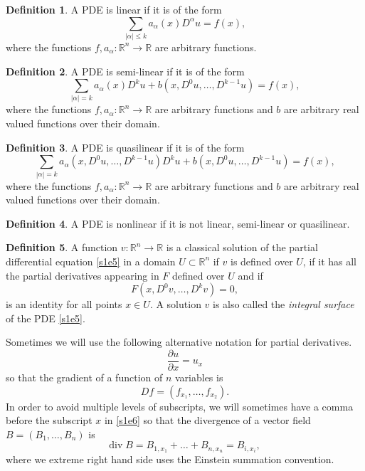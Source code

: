 \documentclass{article}
\newcommand{\pd}[2]{\frac{\partial{#1}}{\partial{#2}}}
\theoremstyle{plain}
\numberwithin{thm}{section}
\theoremstyle{plain}
\numberwithin{prop}{section}
\theoremstyle{definition}
\newtheorem{defn}{Definition}
\numberwithin{defn}{section}
\theoremstyle{remark}
\numberwithin{equation}{section}
\begin{document}
\begin{defn}\label{s1d2}
A PDE is linear if it is of the form
\[
\sum_{|\alpha| \le k}a_\alpha(x) D^\alpha u = f(x),
\]
where the functions $f, a_\alpha: \mathbb{R}^n \rightarrow \mathbb{R}$ are arbitrary functions.
\end{defn}

\begin{defn}\label{s1d3}
A PDE is semi-linear if it is of the form
\[
\sum_{|\alpha|=k}a_\alpha(x)D^ku + b(x, D^0u, \ldots, D^{k-1}u) = f(x),
\]
where the functions $f, a_\alpha: \mathbb{R}^n \rightarrow \mathbb{R}$ are arbitrary functions and 
$b$ are arbitrary real valued functions over their domain.
\end{defn}

\begin{defn}\label{s1d4}
A PDE is quasilinear if it is of the form
\[
\sum_{|\alpha|=k}a_\alpha(x, D^0u, \ldots, D^{k-1}u)D^ku + b(x, D^0u, \ldots, D^{k-1}u) = f(x),
\]
where the functions $f, a_\alpha: \mathbb{R}^n \rightarrow \mathbb{R}$ are arbitrary functions and 
$b$ are arbitrary real valued functions over their domain.
\end{defn}

\begin{defn}\label{s1d5}
A PDE is nonlinear if it is not linear, semi-linear or quasilinear.
\end{defn}

\begin{defn}\label{s1d6}
A function $v:\mathbb{R}^n \rightarrow \mathbb{R}$ is a classical solution of the partial 
differential equation \eqref{s1e5} in a domain $U \subset \mathbb{R}^n$ if $v$ is defined over 
$U$, if it has all the partial derivatives appearing in $F$ defined over $U$ and if 
\[
F(x, D^0v, \ldots, D^kv) = 0,
\]
is an identity for all points $x \in U$. A solution $v$ is also called the \emph{integral 
surface} of the PDE \eqref{s1e5}.
\end{defn}

Sometimes we will use the following alternative notation for partial derivatives.
\begin{equation}\label{s1e6}
\pd{u}{x} = u_{x}
\end{equation}
so that the gradient of a function of $n$ variables is
\[
Df = (f_{ x_1}, \ldots, f_{ x_2}).
\]
In order to avoid multiple levels of subscripts, we will sometimes have a comma before the subscript
$x$ in \eqref{s1e6} so that the divergence of a vector field $B = (B_1, \ldots, B_n)$ is
\[
\text{div}\;B = B_{1, x_1} + \ldots + B_{n,x_n} = B_{i, x_i},
\]
where we extreme right hand side uses the Einstein summation convention.
\end{document}
